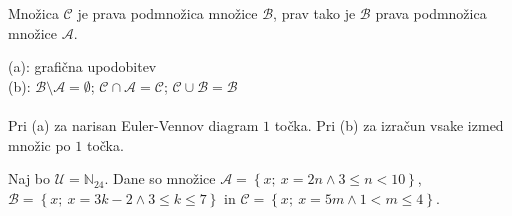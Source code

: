 \documentclass[addpoints]{exam}
\begin{document}
\begin{questions}
    \question
    Množica $\mathcal{C}$ je prava podmnožica množice $\mathcal{B}$, prav tako je $\mathcal{B}$ prava podmnožica množice $\mathcal{A}$.

    \begin{solution}[1cm]
        (a): grafična upodobitev \\
        (b): $\mathcal{B}\setminus\mathcal{A}=\emptyset$; $\mathcal{C}\cap\mathcal{A}=\mathcal{C}$; $\mathcal{C}\cup\mathcal{B}=\mathcal{B}$ \\ \\
        Pri (a) za narisan Euler-Vennov diagram $1$ točka. Pri (b) za izračun vsake izmed množic po $1$ točka.
    \end{solution}





    \question
    Naj bo $\mathcal{U}=\mathbb{N}_{24}$. Dane so množice $\mathcal{A}=\left\{x;\ x=2n \land 3\leq n<10\right\}$, $\mathcal{B}=\left\{x;\ x=3k-2 \land 3\leq k\leq 7\right\}$ in $\mathcal{C}=\left\{x;\ x=5m \land 1<m\leq 4\right\}$. 


\end{questions}
\end{document}
